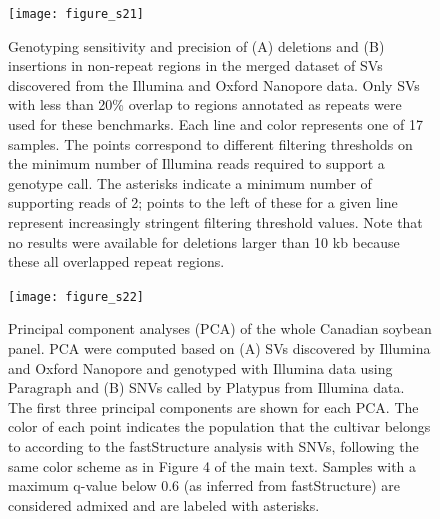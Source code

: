\documentclass[12pt]{article}
\newenvironment{cfigure}
	{\begin{figure} \centering}
	{\end{figure}}
\newenvironment{lsfigure}
	{\begin{landscape} \begin{figure} \centering}
	{\end{figure} \end{landscape}}
\begin{document}
\begin{lsfigure}
	\texttt{[image: figure\_s21]}

	\caption[Sensitivity and precision of joint Illumina/Oxford Nanopore deletion and insertion genotyping in non-repeat regions]{
		Genotyping sensitivity and precision of (A) deletions and (B) insertions in non-repeat regions in the merged dataset of SVs discovered from the Illumina and Oxford Nanopore data. 
		Only SVs with less than 20\% overlap to regions annotated as repeats were used for these benchmarks. 
		Each line and color represents one of 17 samples. 
		The points correspond to different filtering thresholds on the minimum number of Illumina reads required to support a genotype call.
		The asterisks indicate a minimum number of supporting reads of 2; points to the left of these for a given line represent increasingly stringent filtering threshold values.
		Note that no results were available for deletions larger than 10 kb because these all overlapped repeat regions.
	}

	\label{fig_s21}
\end{lsfigure}

\clearpage%

\begin{cfigure}
	\texttt{[image: figure\_s22]}

	\caption[Principal component analyses (PCA) of the whole Canadian soybean panel]{
		Principal component analyses (PCA) of the whole Canadian soybean panel.
		PCA were computed based on (A) SVs discovered by Illumina and Oxford Nanopore and genotyped with Illumina data using Paragraph and (B) SNVs called by Platypus from Illumina data.
		The first three principal components are shown for each PCA. 
		The color of each point indicates the population that the cultivar belongs to according to the fastStructure analysis with SNVs, following the same color scheme as in Figure 4 of the main text.
		Samples with a maximum q-value below 0.6 (as inferred from fastStructure) are considered admixed and are labeled with asterisks.
	}

	\label{fig_s22}

\end{cfigure}

\clearpage%
\end{document}
